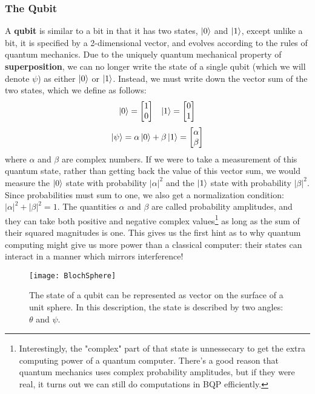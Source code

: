 \subsubsection{The Qubit}
A \textbf{qubit} is similar to a bit in that it has two states, $\ket{0}$ and $\ket{1}$, except unlike a bit, it is specified
by a 2-dimensional vector, and evolves according to the rules of quantum mechanics. Due to the uniquely quantum
mechanical property of \textbf{superposition}, we can no longer write the state of a single qubit (which we will
denote $\psi$) as either $\ket{0}$ or $\ket{1}$. Instead, we must write down the vector sum of the two states,
which we define as follows:
\begin{align}
  \label{eqn:basisstates}
  \ket{0} = \begin{bmatrix}1\\0\end{bmatrix} && \ket{1} = \begin{bmatrix}0\\1\end{bmatrix}
\end{align}
\begin{equation}
  \ket{\psi} = \alpha \ket{0} + \beta \ket{1} = \begin{bmatrix}\alpha\\\beta\end{bmatrix}
\end{equation}
where $\alpha$ and $\beta$ are complex numbers. If we were to take a measurement of this quantum state,
rather than getting back the value of this vector sum, we would measure the $\ket{0}$ state with probability
$|\alpha|^2$ and the $\ket{1}$ state with probability $|\beta|^2$. Since probabilities must sum to one, we also
get a normalization condition: $|\alpha|^2 + |\beta|^2 = 1$. The quantities $\alpha$ and $\beta$ are called
probability amplitudes, and they can take both positive and negative complex values\footnote{Interestingly, the "complex"
  part of that state is unnessecary to get the extra computing power
  of a quantum computer\cite{doi:10.1142/S0219749913500019}. There's a good reason that quantum mechanics
  uses complex probability amplitudes\cite{2004quant.ph..1062A}, but if they were real, it turns out
  we can still do computations in \textsc{BQP} efficiently.}
as long as the sum of their squared magnitudes is one. This gives us the first hint as to why quantum computing
might give us more power than a classical computer: their states can interact in a manner which mirrors
interference!

\begin{figure}
  \texttt{[image: BlochSphere]}
  \caption[The Bloch Sphere representation of a qubit]
  {The state of a qubit can be represented as vector on the surface of a unit sphere. In this description,
  the state is described by two angles: $\theta$ and $\psi$.}
  \label{fig:bloch}
\end{figure}

